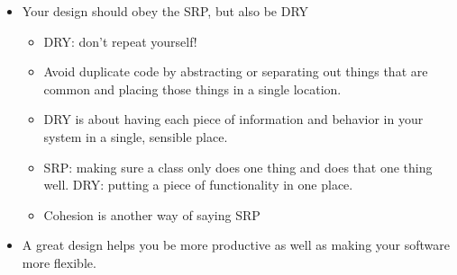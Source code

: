 \documentclass[letterpaper]{article}
\begin{document}
\begin{itemize}
    \item Your design should obey the SRP, but also be DRY 
    \begin{itemize}
        \item DRY: don't repeat yourself! 
        \item Avoid duplicate code by abstracting or separating out things that are common and placing those things in a single location. 
        \item DRY is about having each piece of information and behavior in your system in a single, sensible place. 
        \item SRP: making sure a class only does one thing and does that one thing well. DRY: putting a piece of functionality in one place. 
        \item Cohesion is another way of saying SRP 
    \end{itemize}

    \item A great design helps you be more productive as well as making your software more flexible. 
\end{itemize}
\end{document}
